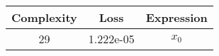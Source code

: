 \begin{center}
        \begin{tabular}{|c|c|c|}
        \hline
        Complexity & Loss & Expression \\
        \hline
        29 & 1.222e-05 & $\begin{aligned}x_{0}\end{aligned}$\\ \hline\end{tabular}
        \end{center}
        